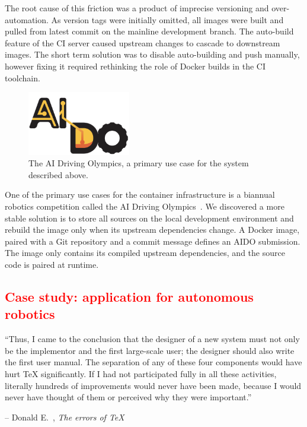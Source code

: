 \documentclass[12pt,initial,twoside,maitrise]{dms}
\newcommand{\rare}[1]{\textcolor{red}{#1}}
\numberwithin{equation}{section}
\numberwithin{table}{chapter}
\numberwithin{figure}{chapter}
\begin{document}
The root cause of this friction was a product of imprecise versioning and over-automation. As version tags were initially omitted, all images were built and pulled from latest commit on the mainline development branch. The auto-build feature of the CI server caused upstream changes to cascade to downstream images. The short term solution was to disable auto-building and push manually, however fixing it required rethinking the role of Docker builds in the CI toolchain.

\begin{figure}
    \includegraphics[width=0.40\textwidth]{aido_logo.png}
    \caption{The AI Driving Olympics, a primary use case for the system described above.}
    \label{fig:aido_logo}
\end{figure}

One of the primary use cases for the container infrastructure is a biannual robotics competition called the AI Driving Olympics~\citep{aido2018}. We discovered a more stable solution is to store all sources on the local development environment and rebuild the image only when its upstream dependencies change. A Docker image, paired with a Git repository and a commit message defines an AIDO submission. The image only contains its compiled upstream dependencies, and the source code is paired at runtime.

\rare{\chapter{Case study: application for autonomous robotics}\label{ch:case-study}}

\setlength{\epigraphwidth}{0.80\textwidth}
\epigraph{``Thus, I came to the conclusion that the designer of a new system must not only be the implementor and the first large-scale user; the designer should also write the first user manual. The separation of any of these four components would have hurt TeX significantly. If I had not participated fully in all these activities, literally hundreds of improvements would never have been made, because I would never have thought of them or perceived why they were important.''}{\begin{flushright}-- Donald E.~\citet{knutherrors}, \textit{The errors of TeX}\end{flushright}}
\end{document}
